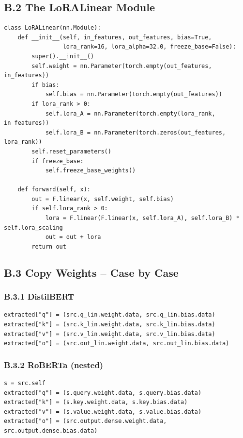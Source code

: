 \subsection{B.2 The LoRALinear Module}

\begin{lstlisting}
class LoRALinear(nn.Module):
    def __init__(self, in_features, out_features, bias=True,
                 lora_rank=16, lora_alpha=32.0, freeze_base=False):
        super().__init__()
        self.weight = nn.Parameter(torch.empty(out_features, in_features))
        if bias:
            self.bias = nn.Parameter(torch.empty(out_features))
        if lora_rank > 0:
            self.lora_A = nn.Parameter(torch.empty(lora_rank, in_features))
            self.lora_B = nn.Parameter(torch.zeros(out_features, lora_rank))
        self.reset_parameters()
        if freeze_base:
            self.freeze_base_weights()
    
    def forward(self, x):
        out = F.linear(x, self.weight, self.bias)
        if self.lora_rank > 0:
            lora = F.linear(F.linear(x, self.lora_A), self.lora_B) * self.lora_scaling
            out = out + lora
        return out
\end{lstlisting}

\subsection{B.3 Copy Weights -- Case by Case}

\subsubsection{B.3.1 DistilBERT}

\begin{lstlisting}
extracted["q"] = (src.q_lin.weight.data, src.q_lin.bias.data)
extracted["k"] = (src.k_lin.weight.data, src.k_lin.bias.data)
extracted["v"] = (src.v_lin.weight.data, src.v_lin.bias.data)
extracted["o"] = (src.out_lin.weight.data, src.out_lin.bias.data)
\end{lstlisting}

\subsubsection{B.3.2 RoBERTa (nested)}

\begin{lstlisting}
s = src.self
extracted["q"] = (s.query.weight.data, s.query.bias.data)
extracted["k"] = (s.key.weight.data, s.key.bias.data)
extracted["v"] = (s.value.weight.data, s.value.bias.data)
extracted["o"] = (src.output.dense.weight.data, src.output.dense.bias.data)
\end{lstlisting}

